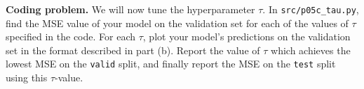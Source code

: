 \clearpage
\item {} \textbf{Coding problem.}
We will now tune the hyperparameter $\tau$. In \texttt{src/p05c\_tau.py}, find
the MSE value of your model on the  validation set for each of the values of
$\tau$ specified in the code. For each $\tau$, plot your model's predictions on
the validation set in the format described in part (b). Report the value of
$\tau$ which achieves the lowest MSE on the \texttt{valid} split, and finally
report the MSE on the \texttt{test} split using this $\tau$-value.

\ifnum{} {
  
} \fi
